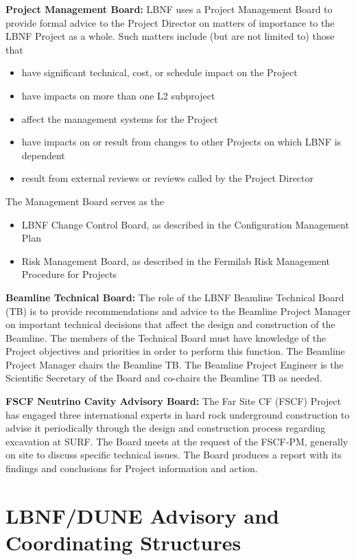 \textbf{Project Management Board:} LBNF uses a Project Management Board to provide formal advice to the Project Director on matters of importance to the LBNF Project as a whole. Such matters include (but are not limited to) those that
\begin{itemize}
\item have significant technical, cost, or schedule impact on the Project
\item have impacts on more than one L2 subproject
\item affect the management systems for the Project
\item have impacts on or result from changes to other Projects on which LBNF is dependent
\item result from external reviews or reviews called by the Project Director
\end{itemize}

The Management Board serves as the
\begin{itemize}
\item LBNF Change Control Board, as described in the Configuration Management Plan\cite{CMP-10760} 
\item Risk Management Board, as described in the Fermilab Risk Management Procedure for Projects~\cite{fnal-risk-mgmt} %
\end{itemize}

\textbf{Beamline Technical Board:} The role of the LBNF Beamline Technical Board (TB) is to provide recommendations and advice to the Beamline Project Manager on important technical decisions that affect the design and construction of the Beamline. The members of the Technical Board must have knowledge of the Project objectives and priorities in order to perform this function. The Beamline Project Manager chairs the Beamline TB. The Beamline Project Engineer is the Scientific Secretary of the Board and co-chairs the Beamline TB as needed. 

\textbf{FSCF Neutrino Cavity Advisory Board:} The Far Site CF (FSCF) Project has engaged three international experts in hard rock underground construction to advise it periodically through the design and construction process regarding excavation at SURF. The Board meets at the request of the FSCF-PM, generally on site to discuss specific technical issues. The Board produces a report with its findings and conclusions for Project information and action. 

\section{LBNF/DUNE Advisory and Coordinating Structures}
\label{sec:lbnf-dune-interface}

